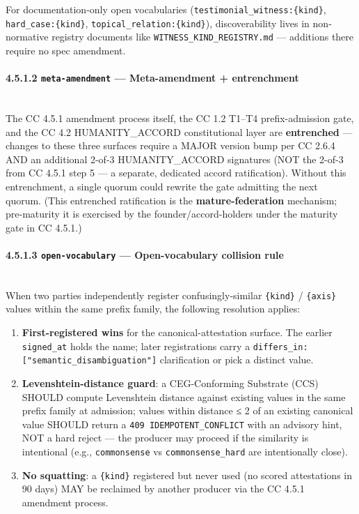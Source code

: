 \documentclass[11pt]{article}
\begin{document}
For documentation-only open vocabularies (\texttt{testimonial\_witness:\{kind\}}, \texttt{hard\_case:\{kind\}}, \texttt{topical\_relation:\{kind\}}), discoverability lives in non-normative registry documents like \texttt{WITNESS\_KIND\_REGISTRY.md} — additions there require no spec amendment.


\paragraph{4.5.1.2 \texttt{meta-amendment} — Meta-amendment + entrenchment}\mbox{}\\


The CC 4.5.1 amendment process itself, the CC 1.2 T1–T4 prefix-admission gate, and the CC 4.2 HUMANITY\_ACCORD constitutional layer are \textbf{entrenched} — changes to these three surfaces require a MAJOR version bump per CC 2.6.4 AND an additional 2-of-3 HUMANITY\_ACCORD signatures (NOT the 2-of-3 from CC 4.5.1 step 5 — a separate, dedicated accord ratification). Without this entrenchment, a single quorum could rewrite the gate admitting the next quorum. (This entrenched ratification is the \textbf{mature-federation} mechanism; pre-maturity it is exercised by the founder/accord-holders under the maturity gate in CC 4.5.1.)


\paragraph{4.5.1.3 \texttt{open-vocabulary} — Open-vocabulary collision rule}\mbox{}\\


When two parties independently register confusingly-similar \texttt{\{kind\}} / \texttt{\{axis\}} values within the same prefix family, the following resolution applies:


\begin{enumerate}\setlength\itemsep{0pt}
\item \textbf{First-registered wins} for the canonical-attestation surface. The earlier \texttt{signed\_at} holds the name; later registrations carry a \texttt{differs\_in: ["semantic\_disambiguation"]} clarification or pick a distinct value.
\item \textbf{Levenshtein-distance guard}: a CEG-Conforming Substrate (CCS) SHOULD compute Levenshtein distance against existing values in the same prefix family at admission; values within distance ≤ 2 of an existing canonical value SHOULD return a \texttt{409 IDEMPOTENT\_CONFLICT} with an advisory hint, NOT a hard reject — the producer may proceed if the similarity is intentional (e.g., \texttt{commonsense} vs \texttt{commonsense\_hard} are intentionally close).
\item \textbf{No squatting}: a \texttt{\{kind\}} registered but never used (no scored attestations in 90 days) MAY be reclaimed by another producer via the CC 4.5.1 amendment process.
\end{enumerate}
\end{document}

